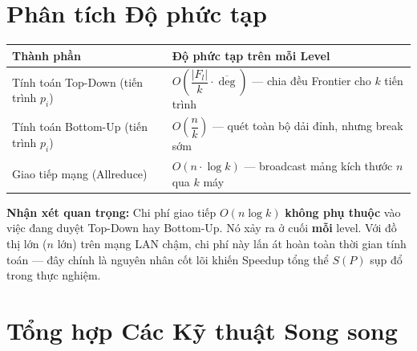 \documentclass[12pt,a4paper]{article}
\begin{document}
\section{Phân tích Độ phức tạp}

\begin{table}[H]
\centering
\begin{tabularx}{\textwidth}{lX}
\toprule
\textbf{Thành phần} & \textbf{Độ phức tạp trên mỗi Level} \\
\midrule
Tính toán Top-Down (tiến trình $p_i$) & $O\left(\dfrac{|F_l|}{k} \cdot \overline{\deg}\right)$ --- chia đều Frontier cho $k$ tiến trình \\[8pt]
Tính toán Bottom-Up (tiến trình $p_i$) & $O\left(\dfrac{n}{k}\right)$ --- quét toàn bộ dải đỉnh, nhưng break sớm \\[8pt]
Giao tiếp mạng (Allreduce) & $O(n \cdot \log k)$ --- broadcast mảng kích thước $n$ qua $k$ máy \\
\bottomrule
\end{tabularx}
\end{table}

\begin{explain}
\textbf{Nhận xét quan trọng:} Chi phí giao tiếp $O(n \log k)$ \textbf{không phụ thuộc} vào việc đang duyệt Top-Down hay Bottom-Up. Nó xảy ra ở cuối \textbf{mỗi} level. Với đồ thị lớn ($n$ lớn) trên mạng LAN chậm, chi phí này lấn át hoàn toàn thời gian tính toán --- đây chính là nguyên nhân cốt lõi khiến Speedup tổng thể $S(P)$ sụp đổ trong thực nghiệm.
\end{explain}

\section{Tổng hợp Các Kỹ thuật Song song}
\end{document}
